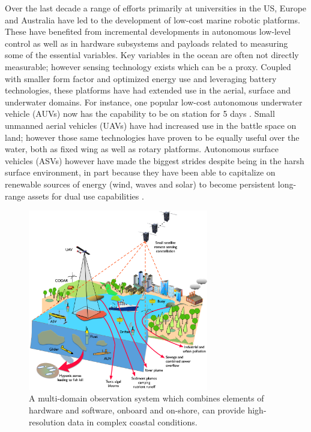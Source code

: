 Over the last decade a range of efforts primarily at universities in
the US, Europe and Australia have led to the development of low-cost
marine robotic platforms. These have benefited from incremental
developments in autonomous low-level control \cite{} as well as in
hardware subsystems and payloads related to measuring some of the
essential variables. Key variables in the ocean are often not directly
measurable; however sensing technology exists which can be a
proxy. Coupled with smaller form factor and optimized energy use and
leveraging battery technologies, these platforms have had extended use
in the aerial, surface and underwater domains. For instance, one
popular low-cost autonomous underwater vehicle (AUVs) now has the
capability to be on station for 5 days
\cite{sousa2012lauv,pinto2013lsts}. Small unmanned aerial vehicles
(UAVs) have had increased use in the battle space on land; however
those same technologies have proven to be equally useful over the
water, both as fixed wing as well as rotary platforms. Autonomous
surface vehicles (ASVs) however have made the biggest strides despite
being in the harsh surface environment, in part because they have been
able to capitalize on renewable sources of energy (wind, waves and
solar) to become persistent long-range assets for dual use
capabilities \cite{}.

\begin{figure}[!t]
  \centering
  \includegraphics[width=0.7\textwidth]{fig/Meteor-Fig-1.jpg}
  \caption{A multi-domain observation system which combines elements
    of hardware and software, onboard and on-shore, can provide
    high-resolution data in complex coastal conditions.}
  \label{fig:concept}
\end{figure}



